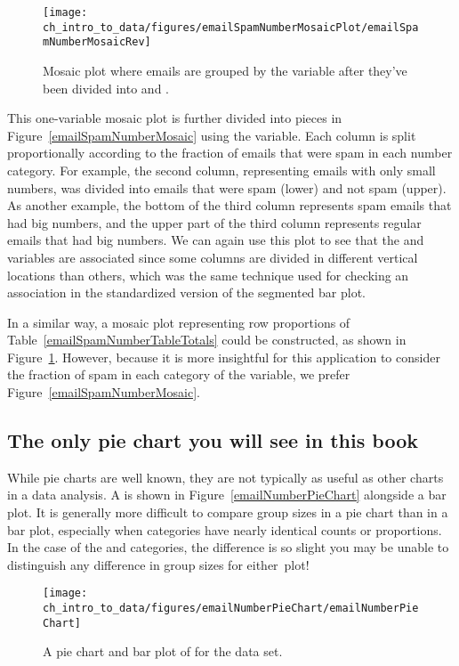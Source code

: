 \begin{figure}
   \centering
   \texttt{[image: ch\_intro\_to\_data/figures/emailSpamNumberMosaicPlot/emailSpamNumberMosaicRev]}
   \caption{Mosaic plot where emails are grouped by the  variable after they've been divided into  and .}
   \label{emailSpamNumberMosaicRev}
\end{figure}

This one-variable mosaic plot is further divided into pieces in Figure~\ref{emailSpamNumberMosaic} using the  variable. Each column is split proportionally according to the fraction of emails that were spam in each number category. For example, the second column, representing emails with only small numbers, was divided into emails that were spam (lower) and not spam (upper). 
As another example, the bottom of the third column represents spam emails that had big numbers, and the upper part of the third column represents regular emails that had big numbers. We can again use this plot to see that the  and  variables are associated since some columns are divided in different vertical locations than others, which was the same technique used for checking an association in the standardized version of the segmented bar plot.

In a similar way, a mosaic plot representing row proportions of Table~\ref{emailSpamNumberTableTotals} could be constructed, as shown in Figure~\ref{emailSpamNumberMosaicRev}. However, because it is more insightful for this application to consider the fraction of spam in each category of the  variable, we prefer Figure~\ref{emailSpamNumberMosaic}.

\subsection{The only pie chart you will see in this book}

While pie charts are well known, they are not typically as useful as other charts in a data analysis. A  is shown in Figure~\vref{emailNumberPieChart} alongside a bar plot. It is generally more difficult to compare group sizes in a pie chart than in a bar plot, especially when categories have nearly identical counts or proportions. In the case of the  and  categories, the difference is so slight you may be unable to distinguish any difference in group sizes for either~plot!

\begin{figure}[h]
   \centering
   \texttt{[image: ch\_intro\_to\_data/figures/emailNumberPieChart/emailNumberPieChart]}
   \caption{A pie chart and bar plot of  for the  data set.}
   \label{emailNumberPieChart}
\end{figure}

